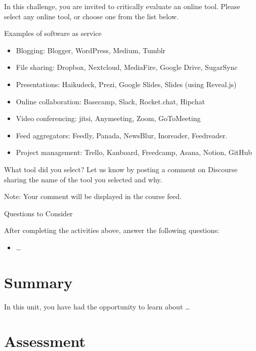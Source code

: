 \documentclass[
]{book}
\providecommand{\tightlist}{%
  \setlength{\itemsep}{0pt}\setlength{\parskip}{0pt}}
\theoremstyle{definition}
\theoremstyle{definition}
\theoremstyle{definition}
\theoremstyle{definition}
\theoremstyle{remark}
\begin{document}
\begin{reflect}
In this challenge, you are invited to critically evaluate an online tool. Please select any online tool, or choose one from the list below.

Examples of software as service

\begin{itemize}
\tightlist
\item
  Blogging: Blogger, WordPress, Medium, Tumblr
\item
  File sharing: Dropbox, Nextcloud, MediaFire, Google Drive, SugarSync
\item
  Presentations: Haikudeck, Prezi, Google Slides, Slides (using Reveal.js)
\item
  Online collaboration: Basecamp, Slack, Rocket.chat, Hipchat
\item
  Video conferencing: jitsi, Anymeeting, Zoom, GoToMeeting
\item
  Feed aggregators: Feedly, Panada, NewsBlur, Inoreader, Feedreader.
\item
  Project management: Trello, Kanboard, Freedcamp, Asana, Notion, GitHub
\end{itemize}

What tool did you select? Let us know by posting a comment on Discourse sharing the name of the tool you selected and why.

Note: Your comment will be displayed in the course feed.

{Questions to Consider}

After completing the activities above, answer the following questions:

\begin{itemize}
\tightlist
\item
  \ldots{}
\end{itemize}
\end{reflect}

\hypertarget{summary-3}{%
\section*{Summary}\label{summary-3}}

In this unit, you have had the opportunity to learn about \ldots{}

\hypertarget{assessment-3}{%
\section*{Assessment}\label{assessment-3}}
\end{document}
